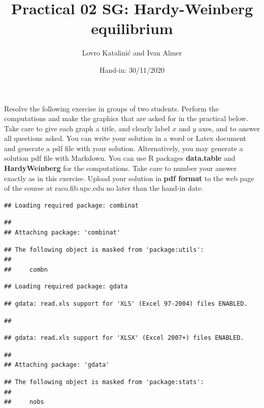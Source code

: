 \documentclass[
]{article}
\title{Practical 02 SG: Hardy-Weinberg equilibrium}
\author{Lovro Katalinić and Ivan Almer}
\date{Hand-in: 30/11/2020}
\begin{document}
\maketitle

Resolve the following exercise in groups of two students. Perform the
computations and make the graphics that are asked for in the practical
below. Take care to give each graph a title, and clearly label \(x\) and
\(y\) axes, and to answer all questions asked. You can write your
solution in a word or Latex document and generate a pdf file with your
solution. Alternatively, you may generate a solution pdf file with
Markdown. You can use R packages \textbf{data.table} and
\textbf{HardyWeinberg} for the computations. Take care to number your
answer exactly as in this exercise. Upload your solution in \textbf{pdf
format} to the web page of the course at raco.fib.upc.edu no later than
the hand-in date.

\begin{verbatim}
## Loading required package: combinat
\end{verbatim}

\begin{verbatim}
## 
## Attaching package: 'combinat'
\end{verbatim}

\begin{verbatim}
## The following object is masked from 'package:utils':
## 
##     combn
\end{verbatim}

\begin{verbatim}
## Loading required package: gdata
\end{verbatim}

\begin{verbatim}
## gdata: read.xls support for 'XLS' (Excel 97-2004) files ENABLED.
\end{verbatim}

\begin{verbatim}
## 
\end{verbatim}

\begin{verbatim}
## gdata: read.xls support for 'XLSX' (Excel 2007+) files ENABLED.
\end{verbatim}

\begin{verbatim}
## 
## Attaching package: 'gdata'
\end{verbatim}

\begin{verbatim}
## The following object is masked from 'package:stats':
## 
##     nobs
\end{verbatim}
\end{document}
